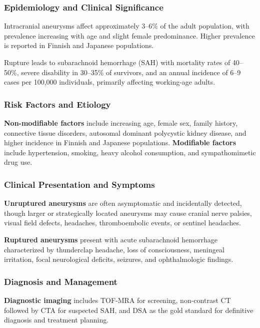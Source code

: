 \documentclass[conference]{IEEEtran}
\begin{document}
\subsubsection{Epidemiology and Clinical Significance}

Intracranial aneurysms affect approximately 3–6\% of the adult population, with prevalence increasing with age and slight female predominance. Higher prevalence is reported in Finnish and Japanese populations.

Rupture leads to subarachnoid hemorrhage (SAH) with mortality rates of 40–50\%, severe disability in 30–35\% of survivors, and an annual incidence of 6–9 cases per 100,000 individuals, primarily affecting working-age adults.

\subsubsection{Risk Factors and Etiology}

\textbf{Non-modifiable factors} include increasing age, female sex, family history, connective tissue disorders, autosomal dominant polycystic kidney disease, and higher incidence in Finnish and Japanese populations.  
\textbf{Modifiable factors} include hypertension, smoking, heavy alcohol consumption, and sympathomimetic drug use.

\subsubsection{Clinical Presentation and Symptoms}

\textbf{Unruptured aneurysms} are often asymptomatic and incidentally detected, though larger or strategically located aneurysms may cause cranial nerve palsies, visual field defects, headaches, thromboembolic events, or sentinel headaches.

\textbf{Ruptured aneurysms} present with acute subarachnoid hemorrhage characterized by thunderclap headache, loss of consciousness, meningeal irritation, focal neurological deficits, seizures, and ophthalmologic findings.

\subsubsection{Diagnosis and Management}

\textbf{Diagnostic imaging} includes TOF-MRA for screening, non-contrast CT followed by CTA for suspected SAH, and DSA as the gold standard for definitive diagnosis and treatment planning.
\end{document}
